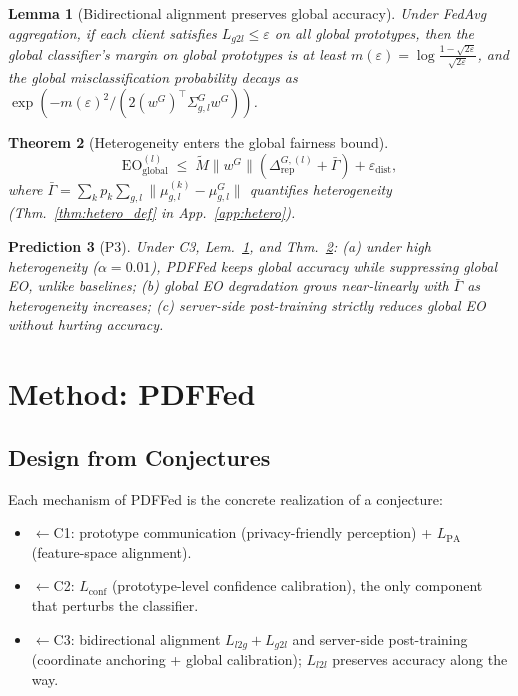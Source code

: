 \documentclass{article}
\newtheorem{theorem}{Theorem}
\newtheorem{lemma}[theorem]{Lemma}
\newtheorem{prediction}[theorem]{Prediction}
\newcommand{\rep}{\Delta_{\mathrm{rep}}}
\newcommand{\proto}{\mu}
\begin{document}
\begin{lemma}[Bidirectional alignment preserves global accuracy]\label{lem:proto_acc}
Under FedAvg aggregation, if each client satisfies $L_{g2l} \leq \varepsilon$
on all global prototypes, then the global classifier's margin on global
prototypes is at least $m(\varepsilon) = \log\frac{1-\sqrt{2\varepsilon}}{\sqrt{2\varepsilon}}$,
and the global misclassification probability decays as
$\exp(-m(\varepsilon)^2 / (2 (w^G)^\top \Sigma_{g,l}^G w^G))$.
\end{lemma}

\begin{theorem}[Heterogeneity enters the global fairness bound]\label{thm:hetero}
\[
\mathrm{EO}^{(l)}_{\mathrm{global}} \;\leq\; \tilde M\|w^G\|
  \left(\rep^{G,(l)} + \bar\Gamma\right) + \varepsilon_{\mathrm{dist}},
\]
where $\bar\Gamma = \sum_k p_k \sum_{g,l} \|\proto_{g,l}^{(k)} - \proto_{g,l}^G\|$
quantifies heterogeneity (Thm.~\ref{thm:hetero_def} in App.~\ref{app:hetero}).
\end{theorem}

\begin{prediction}[P3]\label{pred:p3}
Under C3, Lem.~\ref{lem:proto_acc}, and Thm.~\ref{thm:hetero}: (a) under
high heterogeneity ($\alpha = 0.01$), PDFFed keeps global accuracy while
suppressing global EO, unlike baselines; (b) global EO degradation grows
near-linearly with $\bar\Gamma$ as heterogeneity increases; (c) server-side
post-training strictly reduces global EO without hurting accuracy.
\end{prediction}

\section{Method: PDFFed}
\subsection{Design from Conjectures}
Each mechanism of PDFFed is the concrete realization of a conjecture:
\begin{itemize}
  \item $\leftarrow$C1: prototype communication (privacy-friendly
        perception) + $L_{\mathrm{PA}}$ (feature-space alignment).
  \item $\leftarrow$C2: $L_{\mathrm{conf}}$ (prototype-level confidence
        calibration), the only component that perturbs the classifier.
  \item $\leftarrow$C3: bidirectional alignment $L_{l2g} + L_{g2l}$ and
        server-side post-training (coordinate anchoring + global
        calibration); $L_{l2l}$ preserves accuracy along the way.
\end{itemize}
\end{document}
